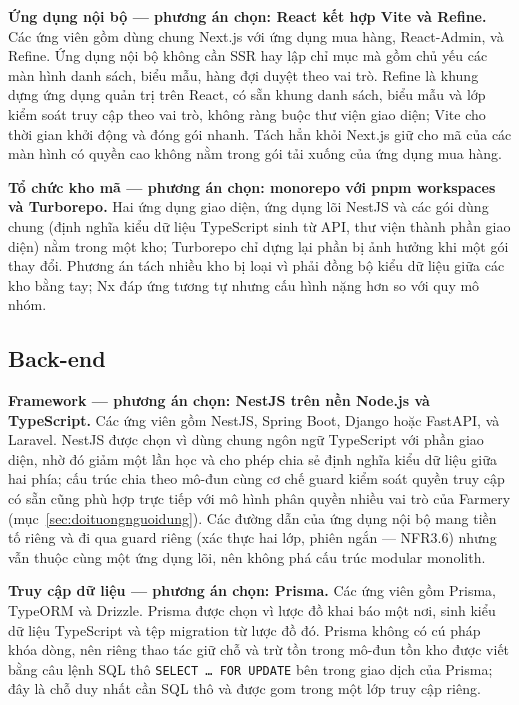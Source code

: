 \noindent\textbf{Ứng dụng nội bộ --- phương án chọn: React kết hợp Vite và Refine.} Các ứng viên gồm dùng chung Next.js với ứng dụng mua hàng, React-Admin, và Refine. Ứng dụng nội bộ không cần SSR hay lập chỉ mục mà gồm chủ yếu các màn hình danh sách, biểu mẫu, hàng đợi duyệt theo vai trò. Refine là khung dựng ứng dụng quản trị trên React, có sẵn khung danh sách, biểu mẫu và lớp kiểm soát truy cập theo vai trò, không ràng buộc thư viện giao diện; Vite cho thời gian khởi động và đóng gói nhanh. Tách hẳn khỏi Next.js giữ cho mã của các màn hình có quyền cao không nằm trong gói tải xuống của ứng dụng mua hàng.

\noindent\textbf{Tổ chức kho mã --- phương án chọn: monorepo với pnpm workspaces và Turborepo.} Hai ứng dụng giao diện, ứng dụng lõi NestJS và các gói dùng chung (định nghĩa kiểu dữ liệu TypeScript sinh từ API, thư viện thành phần giao diện) nằm trong một kho; Turborepo chỉ dựng lại phần bị ảnh hưởng khi một gói thay đổi. Phương án tách nhiều kho bị loại vì phải đồng bộ kiểu dữ liệu giữa các kho bằng tay; Nx đáp ứng tương tự nhưng cấu hình nặng hơn so với quy mô nhóm.

\subsection{Back-end}

\noindent\textbf{Framework --- phương án chọn: NestJS trên nền Node.js và TypeScript.} Các ứng viên gồm NestJS, Spring Boot, Django hoặc FastAPI, và Laravel. NestJS được chọn vì dùng chung ngôn ngữ TypeScript với phần giao diện, nhờ đó giảm một lần học và cho phép chia sẻ định nghĩa kiểu dữ liệu giữa hai phía; cấu trúc chia theo mô-đun cùng cơ chế guard kiểm soát quyền truy cập có sẵn cũng phù hợp trực tiếp với mô hình phân quyền nhiều vai trò của Farmery (mục~\ref{sec:doituongnguoidung}). Các đường dẫn của ứng dụng nội bộ mang tiền tố riêng và đi qua guard riêng (xác thực hai lớp, phiên ngắn --- NFR3.6) nhưng vẫn thuộc cùng một ứng dụng lõi, nên không phá cấu trúc modular monolith.

\noindent\textbf{Truy cập dữ liệu --- phương án chọn: Prisma.} Các ứng viên gồm Prisma, TypeORM và Drizzle. Prisma được chọn vì lược đồ khai báo một nơi, sinh kiểu dữ liệu TypeScript và tệp migration từ lược đồ đó. Prisma không có cú pháp khóa dòng, nên riêng thao tác giữ chỗ và trừ tồn trong mô-đun tồn kho được viết bằng câu lệnh SQL thô \texttt{SELECT \ldots{} FOR UPDATE} bên trong giao dịch của Prisma; đây là chỗ duy nhất cần SQL thô và được gom trong một lớp truy cập riêng.

